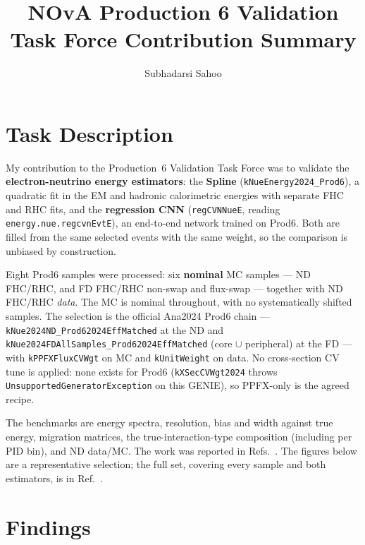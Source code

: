 \documentclass{article}
\title{NOvA Production 6 Validation Task Force Contribution Summary}
\author{Subhadarsi Sahoo}
\begin{document}
\maketitle

\section{Task Description}

My contribution to the Production~6 Validation Task Force was to validate the
\textbf{electron-neutrino energy estimators}: the \textbf{Spline}
(\texttt{kNueEnergy2024\_Prod6}), a quadratic fit in the EM and hadronic
calorimetric energies with separate FHC and RHC fits, and the \textbf{regression
CNN} (\texttt{regCVNNueE}, reading \texttt{energy.nue.regcvnEvtE}), an end-to-end
network trained on Prod6. Both are filled from the same selected events with the
same weight, so the comparison is unbiased by construction.

Eight Prod6 samples were processed: six \textbf{nominal} MC samples --- ND
FHC/RHC, and FD FHC/RHC non-swap and flux-swap --- together with ND FHC/RHC
\emph{data}. The MC is nominal throughout, with no systematically shifted
samples. The selection is the official Ana2024
Prod6 chain --- \texttt{kNue2024ND\_\allowbreak Prod62024EffMatched} at the ND and
\texttt{kNue2024FDAllSamples\_\allowbreak Prod62024EffMatched} (core $\cup$ peripheral) at the
FD --- with \texttt{kPPFXFluxCVWgt} on MC and \texttt{kUnitWeight} on data. No
cross-section CV tune is applied: none exists for Prod6
(\texttt{kXSecCVWgt2024} throws \texttt{Unsupported\allowbreak GeneratorException} on this
GENIE), so PPFX-only is the agreed recipe.

The benchmarks are energy spectra, resolution, bias and width
against true energy, migration matrices, the true-interaction-type composition
(including per PID bin), and ND data/MC. The work was reported in
Refs.~\cite{docdb-70195, docdb-69940, docdb-70459, docdb-70698}. The figures
below are a representative selection; the full set, covering every sample and
both estimators, is in Ref.~\cite{docdb-70698}.

\section{Findings}
\end{document}
